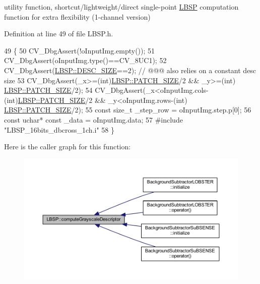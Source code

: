 utility function, shortcut/lightweight/direct single-\/point \mbox{\hyperlink{class_l_b_s_p}{L\+B\+SP}} computation function for extra flexibility (1-\/channel version) 



Definition at line 49 of file L\+B\+S\+P.\+h.


\begin{DoxyCode}
49                                                                                                            
                                                  \{
50         CV\_DbgAssert(!oInputImg.empty());
51         CV\_DbgAssert(oInputImg.type()==CV\_8UC1);
52         CV\_DbgAssert(\mbox{\hyperlink{class_l_b_s_p_a11167130ddc713921e5bbb0b628d5f74}{LBSP::DESC\_SIZE}}==2); \textcolor{comment}{// @@@ also relies on a constant desc size}
53         CV\_DbgAssert(\_x>=(\textcolor{keywordtype}{int})\mbox{\hyperlink{class_l_b_s_p_aa98abb79a155d3a2b416c2ab32e74929}{LBSP::PATCH\_SIZE}}/2 && \_y>=(\textcolor{keywordtype}{int})
      \mbox{\hyperlink{class_l_b_s_p_aa98abb79a155d3a2b416c2ab32e74929}{LBSP::PATCH\_SIZE}}/2);
54         CV\_DbgAssert(\_x<oInputImg.cols-(\textcolor{keywordtype}{int})\mbox{\hyperlink{class_l_b_s_p_aa98abb79a155d3a2b416c2ab32e74929}{LBSP::PATCH\_SIZE}}/2 && \_y<oInputImg.rows-(\textcolor{keywordtype}{int})
      \mbox{\hyperlink{class_l_b_s_p_aa98abb79a155d3a2b416c2ab32e74929}{LBSP::PATCH\_SIZE}}/2);
55         \textcolor{keyword}{const} \textcolor{keywordtype}{size\_t} \_step\_row = oInputImg.step.p[0];
56         \textcolor{keyword}{const} uchar* \textcolor{keyword}{const} \_data = oInputImg.data;
57 \textcolor{preprocessor}{        #include "LBSP\_16bits\_dbcross\_1ch.i"}
58     \}
\end{DoxyCode}
Here is the caller graph for this function\+:\nopagebreak
\begin{figure}[H]
\begin{center}
\leavevmode
\includegraphics[width=350pt]{class_l_b_s_p_a4a5f635868b6b81ba53df2692ee3dfd8_icgraph}
\end{center}
\end{figure}
\mbox{\label{class_l_b_s_p_a1a9b0613104169b3cdf567f7625c7fc4}} 
